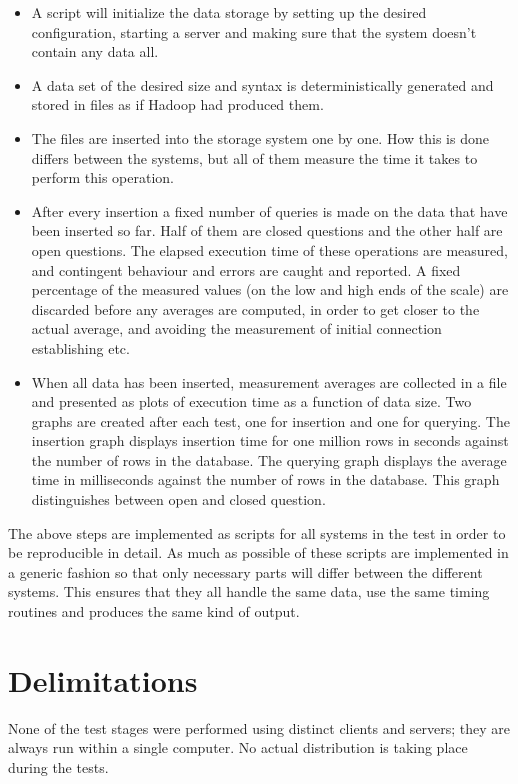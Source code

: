 \begin{itemize}
\item A script will initialize the data storage by setting up the desired configuration, starting a server and making sure that the system doesn't contain any data all.
\item A data set of the desired size and syntax is deterministically generated and stored in files as if Hadoop had produced them.
\item The files are inserted into the storage system one by one. How this is done differs between the systems, but all of them measure the time it takes to perform this operation.
\item After every insertion a fixed number of queries is made on the data that have been inserted so far. Half of them are closed questions and the other half are open questions. The elapsed execution time of these operations are measured, and contingent behaviour and errors are caught and reported. A fixed percentage of the measured values (on the low and high ends of the scale) are discarded before any averages are computed, in order to get closer to the actual average, and avoiding the measurement of initial connection establishing etc.
\item When all data has been inserted, measurement averages are collected in a file and presented as plots of execution time as a function of data size. Two graphs are created after each test, one for insertion and one for querying. The insertion graph displays insertion time for one million rows in seconds against the number of rows in the database. The querying graph displays the average time in milliseconds against the number of rows in the database. This graph distinguishes between open and closed question.
\end{itemize}

The above steps are implemented as scripts for all systems in the test in order to be reproducible in detail. As much as possible of these scripts are implemented in a generic fashion so that only necessary parts will differ between the different systems. This ensures that they all handle the same data, use the same timing routines and produces the same kind of output.

\section{Delimitations}
None of the test stages were performed using distinct clients and servers; they are always run within a single computer. No actual distribution is taking place during the tests.

